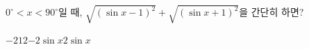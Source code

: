 $0^\circ<x<90^\circ$일 때, $\sqrt{(\sin x-1)^2}+\sqrt{(\sin x+1)^2}$을 간단히 하면?
\begin{choices32}{$-2$}{$1$}{$2$}{$-2\sin x$}{$2\sin x$}\end{choices32}
